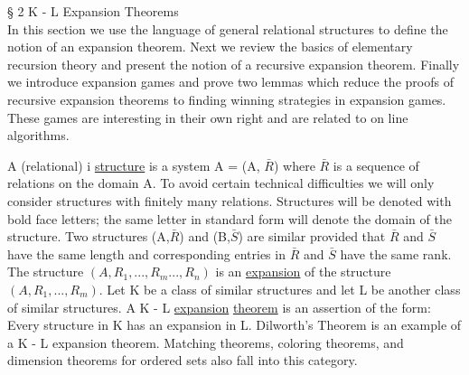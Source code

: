 \documentclass[twoside]{article}
\begin{document}
\vspace{1cm}
\noindent \S \hspace{1pt} 2   K - L   Expansion Theorems\\


In this section we use the language of general relational structures to define the notion of an expansion theorem.   Next we review the basics of elementary recursion theory and present the notion of a recursive expansion theorem.    Finally we introduce expansion games and prove two lemmas which reduce the proofs of recursive expansion theorems to finding winning strategies in expansion games.   These games are interesting in their own right and are related to on line algorithms.

\newpage

A (relational) i \underline{structure} is a system   A = (A, $\bar{R}$)   where   $\bar{R}$   is a sequence of relations on the domain   A.   
To avoid certain technical difficulties we will only consider structures with finitely many relations.    
Structures will be denoted with bold face letters;  the same letter in standard form will denote the domain of the structure.   
Two structures (A,$\bar{R}$)   and   (B,$\bar{S}$) are similar    provided that   $\bar{R}$   and   $\bar{S}$ have    the same length and corresponding entries in   $\bar{R}$   and    $\bar{S}$   have the same rank.    The structure
$(A,R_1,...,R_m...,R_n)$    is an \underline{expansion} of  the structure    $(A,R_1,...,R_m)$.    
Let K be a class of similar structures and let   L   be another class of similar structures.   
A   K - L   \underline{expansion} \underline{theorem} is an assertion of the form: Every structure in   K   has an expansion in   L.    Dilworth's Theorem is an example of a   K - L   expansion theorem. Matching theorems, coloring theorems, and dimension theorems for ordered sets also fall into this category.
\end{document}
